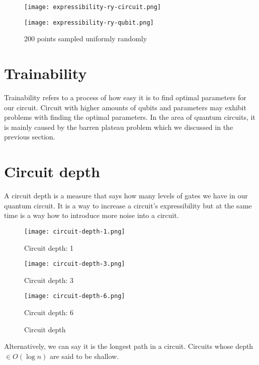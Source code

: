 \begin{figure}[H]
    \centering
    \begin{minipage}{0.4\linewidth}
        \centering
        \texttt{[image: expressibility-ry-circuit.png]}
        \vfill
    \end{minipage}
    \hfill
    \begin{minipage}{0.4\linewidth}
        \centering
        \texttt{[image: expressibility-ry-qubit.png]}
        \vfill
    \end{minipage}
    \caption{200 points sampled uniformly randomly}
\end{figure}


\section{Trainability}
Trainability refers to a process of how easy it is to find optimal parameters for our circuit. Circuit with higher amounts of qubits and parameters may exhibit problems with finding the optimal parameters. In the area of quantum circuits, it is mainly caused by the barren plateau problem which we discussed in the previous section.

\section{Circuit depth}
A circuit depth is a measure that says how many levels of gates we have in our quantum circuit. It is a way to increase a circuit's expressibility but at the same time is a way how to introduce more noise into a circuit. 

\begin{figure}[H]
    \centering
    \begin{minipage}{0.2\linewidth}
        \centering
        \texttt{[image: circuit-depth-1.png]}
        \caption*{Circuit depth: 1}\label{fig:circuit_depth_1}
    \end{minipage}
    \hfill
    \begin{minipage}{0.3\linewidth}
        \centering
        \texttt{[image: circuit-depth-3.png]}
        \caption*{Circuit depth: 3}\label{fig:circuit_depth_3}
    \end{minipage}
    \hfill
    \begin{minipage}{0.45\linewidth}
        \centering
        \texttt{[image: circuit-depth-6.png]}
        \caption*{Circuit depth: 6}\label{fig:circuit_depth_6}
    \end{minipage}
    \caption{Circuit depth}
\end{figure}
Alternatively, we can say it is the longest path in a circuit. Circuits whose depth $\in O(\log n)$ are said to be shallow. 

